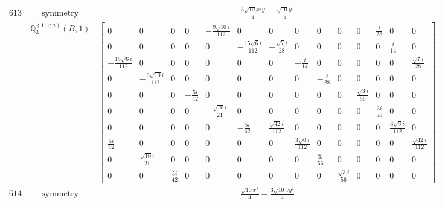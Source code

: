 \documentclass[fleqn,8pt,landscape]{jsarticle}
\begin{document}
\begin{longtable}{ccc}
$ 613 $ & $ \text{symmetry} $ & $ \frac{3 \sqrt{10} x^{2} y}{4} - \frac{\sqrt{10} y^{3}}{4} $ \\
$  $ & $ \mathbb{Q}_{3}^{(1,1;a)}(B,1) $ & $ \begin{bmatrix} 0 & 0 & 0 & 0 & - \frac{9 \sqrt{10} i}{112} & 0 & 0 & 0 & 0 & 0 & 0 & \frac{i}{28} & 0 & 0 \\ 0 & 0 & 0 & 0 & 0 & - \frac{15 \sqrt{6} i}{112} & - \frac{\sqrt{7} i}{28} & 0 & 0 & 0 & 0 & 0 & \frac{i}{14} & 0 \\ - \frac{15 \sqrt{6} i}{112} & 0 & 0 & 0 & 0 & 0 & 0 & - \frac{i}{14} & 0 & 0 & 0 & 0 & 0 & \frac{\sqrt{7} i}{28} \\ 0 & - \frac{9 \sqrt{10} i}{112} & 0 & 0 & 0 & 0 & 0 & 0 & - \frac{i}{28} & 0 & 0 & 0 & 0 & 0 \\ 0 & 0 & 0 & - \frac{5 i}{42} & 0 & 0 & 0 & 0 & 0 & 0 & \frac{\sqrt{3} i}{56} & 0 & 0 & 0 \\ 0 & 0 & 0 & 0 & - \frac{\sqrt{10} i}{21} & 0 & 0 & 0 & 0 & 0 & 0 & \frac{3 i}{56} & 0 & 0 \\ 0 & 0 & 0 & 0 & 0 & - \frac{5 i}{42} & \frac{\sqrt{42} i}{112} & 0 & 0 & 0 & 0 & 0 & \frac{3 \sqrt{6} i}{112} & 0 \\ \frac{5 i}{42} & 0 & 0 & 0 & 0 & 0 & 0 & \frac{3 \sqrt{6} i}{112} & 0 & 0 & 0 & 0 & 0 & \frac{\sqrt{42} i}{112} \\ 0 & \frac{\sqrt{10} i}{21} & 0 & 0 & 0 & 0 & 0 & 0 & \frac{3 i}{56} & 0 & 0 & 0 & 0 & 0 \\ 0 & 0 & \frac{5 i}{42} & 0 & 0 & 0 & 0 & 0 & 0 & \frac{\sqrt{3} i}{56} & 0 & 0 & 0 & 0 \end{bmatrix} $ \\ \hline
$ 614 $ & $ \text{symmetry} $ & $ \frac{\sqrt{10} x^{3}}{4} - \frac{3 \sqrt{10} x y^{2}}{4} $ \\

\end{longtable}
\end{document}
